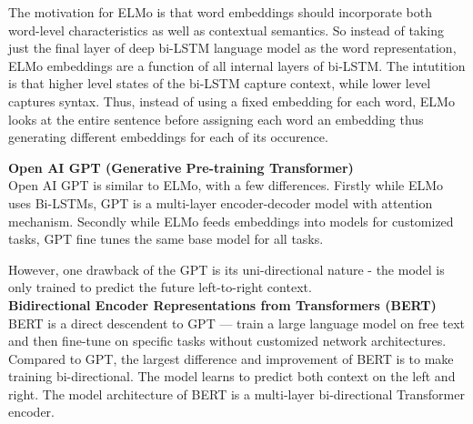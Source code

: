 The motivation for ELMo \cite{peters2018deep} is that word embeddings should incorporate both word-level characteristics as well as contextual semantics. So instead of taking just the final layer of deep bi-LSTM language model as the word representation, ELMo embeddings are a function of all internal layers of bi-LSTM. The intutition is that higher level states of the bi-LSTM capture context, while lower level captures syntax. Thus, instead of using a fixed embedding for each word, ELMo looks at the entire sentence before assigning each word an embedding thus generating different embeddings for each of its occurence.

\newpage
\noindent \textbf{Open AI GPT (Generative Pre-training Transformer)}\\

Open AI GPT \cite{radford2018improving} is similar to ELMo, with a few differences. Firstly while ELMo uses Bi-LSTMs, GPT is a multi-layer encoder-decoder model with attention mechanism. Secondly while ELMo feeds embeddings into models for customized tasks, GPT fine tunes the same base model for all tasks.

However, one drawback of the GPT is its uni-directional nature - the model is only trained to predict the future left-to-right context.\\

\noindent \textbf{Bidirectional Encoder Representations from Transformers (BERT)}\\

BERT \cite{devlin2018bert} is a direct descendent to GPT — train a large language model on free text and then fine-tune on specific tasks without customized network architectures. Compared to GPT, the largest difference and improvement of BERT is to make training bi-directional. The model learns to predict both context on the left and right. The model architecture of BERT is a multi-layer bi-directional Transformer encoder.